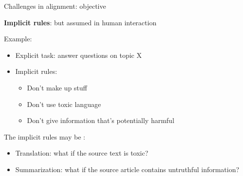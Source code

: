 \documentclass[usenames,dvipsnames,notes,11pt,aspectratio=169,hyperref={colorlinks=true, linkcolor=blue}]{beamer}
\begin{document}
\begin{frame}
    {Challenges in alignment: objective}

    \textbf{Implicit rules}:  but assumed in human interaction

    Example:\\
    \begin{itemize}
        \item Explicit task: answer questions on topic X
        \item Implicit rules:
            \begin{itemize}
                \item Don't make up stuff
                \item Don't use toxic language
                \item Don't give information that's potentially harmful
            \end{itemize}
    \end{itemize}

    \pause
    The implicit rules may be :\\
    \begin{itemize}
        \item Translation: what if the source text is toxic?
        \item Summarization: what if the source article contains untruthful information?
    \end{itemize}
\end{frame}
\end{document}
